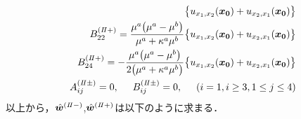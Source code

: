 \begin{align}
	\bigl\{u_{x_{1},x_{2}}(\bm{x_{0}})+u_{x_{2},x_{1}}(\bm{x_{0}})\bigr\}&
	\nonumber
	\\
	B_{22}^{(I\hspace{-.15em}I+)}=\frac{\mu^{a}\bigl(\mu^{a}-\mu^{b}\bigr)}{\mu^{a}+\kappa^{a}\mu^{b}}
	\bigl\{u_{x_{1},x_{2}}(\bm{x_{0}})+u_{x_{2},x_{1}}(\bm{x_{0}})\bigr\}&
	\nonumber\\
	B_{24}^{(I\hspace{-.15em}I+)}=-\frac{\mu^{a}\bigl(\mu^{a}-\mu^{b}\bigr)}{2\bigl(\mu^{a}+\kappa^{a}\mu^{b}\bigr)}
	\bigl\{u_{x_{1},x_{2}}(\bm{x_{0}})+u_{x_{2},x_{1}}(\bm{x_{0}})\bigr\}&
	\nonumber
	\\
	A_{ij}^{(I\hspace{-.15em}I\pm)}=0,\hspace{0.5cm}
	B_{ij}^{(I\hspace{-.15em}I\pm)}=0,\hspace{0.5cm}(i=1,i\geq3,1\leq j\leq4)
\end{align}
以上から，$\hat{\bm{w}}^{(I\hspace{-.15em}I-)}$,$\hat{\bm{w}}^{(I\hspace{-.15em}I+)}$は以下のように求まる．
